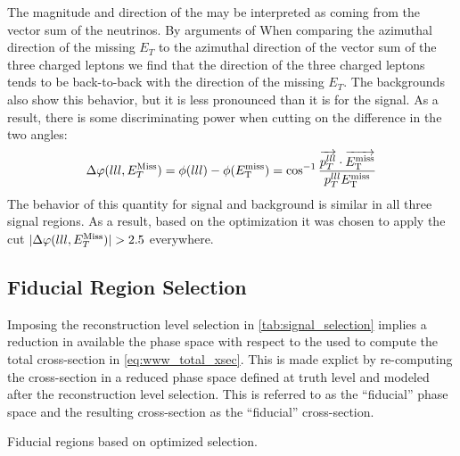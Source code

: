 The magnitude and direction
of the \MET may be interpreted as coming from the 
vector sum of the neutrinos.  By arguments of 
When comparing the azimuthal direction 
of the missing $E_{T}$ to the azimuthal direction of the vector
sum of the three charged leptons
we find that 
the direction of the three charged leptons
tends to be back-to-back with the direction of the 
missing $E_{T}$. The
backgrounds also show this behavior, but it is less pronounced than 
it is for the signal.  As a result, 
there is some discriminating power when cutting on the difference 
in the two angles: 
\begin{equation}
\Delta\varphi(lll,E_{T}^{\textrm{Miss}}) = \phi(lll)-\phi(E_{\mathrm{T}}^{\mathrm{miss}}) = \cos^{-1}\frac{ \overrightarrow{p_{T}^{lll}}\cdot\overrightarrow{E_{\mathrm{T}}^{\mathrm{miss}}} }{ p_{T}^{lll}E_{\mathrm{T}}^{\mathrm{miss}} } 
\end{equation}
The behavior of this quantity for signal and
background is similar in all three signal regions.
As a result, based on the 
optimization it was chosen to apply the cut
$|\Delta\varphi(lll,E_{T}^{\textrm{Miss}})| > 2.5$ everywhere.  



\subsection{Fiducial Region Selection}
\label{sec:fiducial}

Imposing the reconstruction level selection in \tab\ref{tab:signal_selection}
implies a reduction in available the phase space with respect to the 
used to compute the total cross-section in \eqn\eqref{eq:www_total_xsec}.
This is made explict by re-computing the cross-section in a reduced
phase space defined at truth level and modeled after the reconstruction
level selection. This is referred to as the ``fiducial'' phase space
and the resulting cross-section as the ``fiducial'' cross-section.



\begin{table}[ht!]
\centering
\begin{small}

\end{small}
\caption{Fiducial regions based on optimized selection.}
\label{tab:fiducial_selection}
\end{table}

